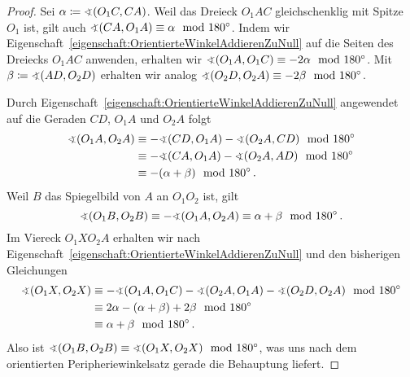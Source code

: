 \begin{proof}
	Sei $\alpha \coloneqq \winkel(O_1C, CA)$. Weil das Dreieck $O_1AC$ gleichschenklig mit Spitze $O_1$ ist, gilt auch $\winkel(CA,O_1A)\equiv \alpha \mod 180^\circ$. Indem wir Eigenschaft~\ref{eigenschaft:OrientierteWinkelAddierenZuNull} auf die Seiten des Dreiecks $O_1AC$ anwenden, erhalten wir $\winkel (O_1A,O_1C)\equiv -2\alpha \mod 180^\circ$. Mit $\beta \coloneqq \winkel(AD,O_2D)$ erhalten wir analog $\winkel(O_2D,O_2A)\equiv -2\beta \mod 180^\circ$.
	
	Durch Eigenschaft~\ref{eigenschaft:OrientierteWinkelAddierenZuNull} angewendet auf die Geraden $CD$, $O_1A$ und $O_2A$ folgt 
	\begin{align*}
		\winkel(O_1A,O_2A)&\equiv-\winkel(CD,O_1A)-\winkel(O_2A,CD)\mod 180^\circ\\
		&\equiv-\winkel(CA,O_1A)-\winkel(O_2A,AD)\mod 180^\circ\\
		&\equiv-(\alpha + \beta) \mod 180^\circ\,.
	\end{align*}
	Weil $B$ das Spiegelbild von $A$ an $O_1O_2$ ist, gilt
	\begin{equation*}
		\winkel(O_1B,O_2B)\equiv -\winkel(O_1A,O_2A)\equiv \alpha + \beta \mod 180^\circ\,.
	\end{equation*}
	Im Viereck $O_1XO_2A$ erhalten wir nach Eigenschaft~\ref{eigenschaft:OrientierteWinkelAddierenZuNull} und den bisherigen Gleichungen
	\begin{align*}
		\winkel(O_1X,O_2X) &\equiv -\winkel(O_1A,O_1C) - \winkel(O_2A,O_1A) - \winkel(O_2D,O_2A) \mod 180^\circ\\
		&\equiv 2\alpha - (\alpha + \beta) + 2\beta \mod 180^\circ\\
		&\equiv \alpha + \beta \mod 180^\circ\,.
	\end{align*}
	Also ist $\winkel(O_1B,O_2B)\equiv \winkel(O_1X,O_2X) \mod 180^\circ$, was uns nach dem orientierten Peripheriewinkelsatz gerade die Behauptung liefert.
\end{proof}